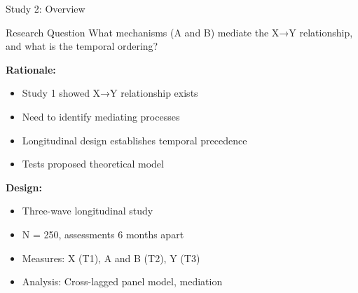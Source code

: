 \documentclass[aspectratio=169,12pt]{beamer}
\begin{document}
\begin{frame}{Study 2: Overview}
  \begin{exampleblock}{Research Question}
    What mechanisms (A and B) mediate the X→Y relationship, and what is the temporal ordering?
  \end{exampleblock}

  \vspace{0.5cm}

  \textbf{Rationale:}
  \begin{itemize}
    \item Study 1 showed X→Y relationship exists
    \item Need to identify mediating processes
    \item Longitudinal design establishes temporal precedence
    \item Tests proposed theoretical model
  \end{itemize}

  \vspace{0.5cm}

  \textbf{Design:}
  \begin{itemize}
    \item Three-wave longitudinal study
    \item N = 250, assessments 6 months apart
    \item Measures: X (T1), A and B (T2), Y (T3)
    \item Analysis: Cross-lagged panel model, mediation
  \end{itemize}
\end{frame}
\end{document}
